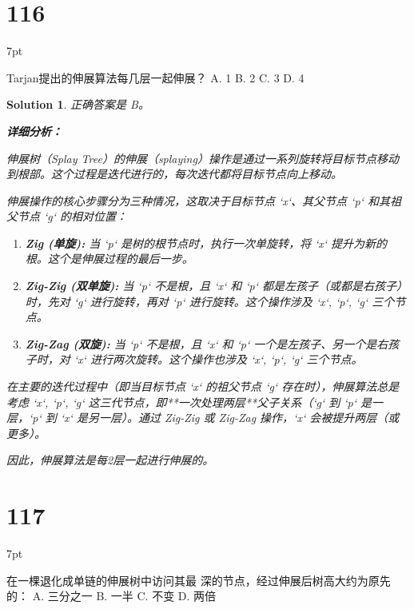 \documentclass[UTF8]{report}
\newtheorem{solution}{Solution}
\theoremstyle{MyLineTheoremStyle} %
\theoremstyle{MyBlockTheoremStyle} %
\theoremstyle{MySubsubsectionStyle} %
\newenvironment{graybox}{%
        \def\FrameCommand{%
        \hspace{1pt}%
        {\color{gray}\small \vrule width 2pt}%
        {\color{graybox_color}\vrule width 4pt}%
        \colorbox{graybox_color}%
        }%
        \MakeFramed{\advance\hsize-\width\FrameRestore}%
        \noindent\hspace{-4.55pt}%
        \begin{adjustwidth}{}{7pt}%
        \vspace{2pt}\vspace{2pt}%
        }
        {%
        \vspace{2pt}\end{adjustwidth}\endMakeFramed%
        }
\begin{document}
\section*{116}
\begin{graybox}
Tarjan提出的伸展算法每几层一起伸展？
A. 1
B. 2
C. 3
D. 4
\end{graybox}

\begin{solution}
正确答案是 B。

\textbf{详细分析：}

伸展树（Splay Tree）的伸展（splaying）操作是通过一系列旋转将目标节点移动到根部。这个过程是迭代进行的，每次迭代都将目标节点向上移动。

伸展操作的核心步骤分为三种情况，这取决于目标节点 `x`、其父节点 `p` 和其祖父节点 `g` 的相对位置：

\begin{enumerate}
    \item \textbf{Zig (单旋):} 当 `p` 是树的根节点时，执行一次单旋转，将 `x` 提升为新的根。这个是伸展过程的最后一步。

    \item \textbf{Zig-Zig (双单旋):} 当 `p` 不是根，且 `x` 和 `p` 都是左孩子（或都是右孩子）时，先对 `g` 进行旋转，再对 `p` 进行旋转。这个操作涉及 `x`, `p`, `g` 三个节点。

    \item \textbf{Zig-Zag (双旋):} 当 `p` 不是根，且 `x` 和 `p` 一个是左孩子、另一个是右孩子时，对 `x` 进行两次旋转。这个操作也涉及 `x`, `p`, `g` 三个节点。
\end{enumerate}

在主要的迭代过程中（即当目标节点 `x` 的祖父节点 `g` 存在时），伸展算法总是考虑 `x`, `p`, `g` 这三代节点，即**一次处理两层**父子关系（`g` 到 `p` 是一层，`p` 到 `x` 是另一层）。通过 Zig-Zig 或 Zig-Zag 操作，`x` 会被提升两层（或更多）。

因此，伸展算法是每2层一起进行伸展的。
\end{solution}


\section*{117}
\begin{graybox}
在一棵退化成单链的伸展树中访问其最
深的节点，经过伸展后树高大约为原先的：
A. 三分之一
B. 一半
C. 不变
D. 两倍
\end{graybox}
\end{document}
